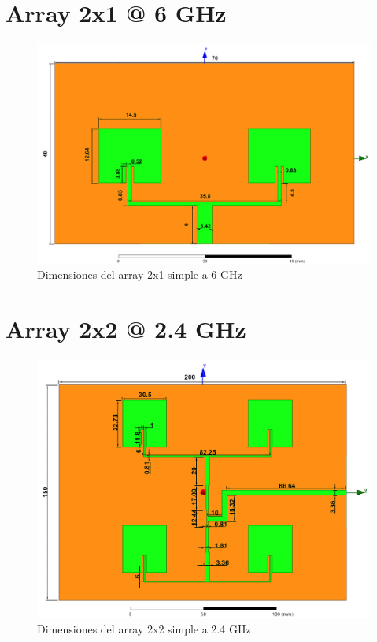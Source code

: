 \section{Array 2x1 @ 6 GHz}
\vfill
\begin{figure}[H]
   	 \centering
        \includegraphics[width=\textwidth ,height=\textheight, keepaspectratio=true,angle=90,origin=c]{archivos/desarrollo/autocad/4}
        \caption{Dimensiones del array 2x1 simple a 6 GHz}
        \label{fig:2x12}
\end{figure}
\vfill
\newpage

\section{Array 2x2 @ 2.4 GHz}
\vfill
\begin{figure}[H]
   	 \centering
        \includegraphics[width=\textwidth ,height=\textheight, keepaspectratio=true]{archivos/desarrollo/autocad/7}
        \caption{Dimensiones del array 2x2 simple a 2.4 GHz}
        \label{fig:2x21}
\end{figure}
\vfill
\newpage

